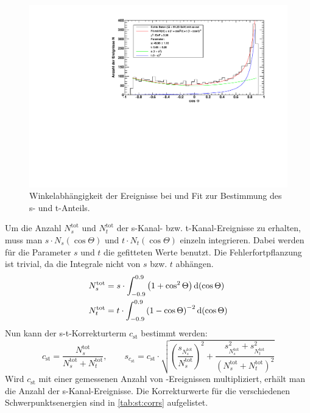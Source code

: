 \begin{figure}[H]
    \begin{center}
        \includegraphics[width=\textwidth]{../img/s_t_fit_91-23.pdf}
        \caption{Winkelabhängigkeit der Ereignisse bei  und Fit zur Bestimmung des s- und t-Anteils.}
        \label{img:st:9123}
    \end{center}
\end{figure}
Um die Anzahl $N_s^\text{tot}$ und $N_t^\text{tot}$ der s-Kanal- bzw. t-Kanal-Ereignisse zu erhalten, muss man
$s \cdot N_s(\cos \Theta)$ und $t \cdot N_t(\cos \Theta)$ einzeln integrieren. Dabei werden für die Parameter $s$ und $t$ die
gefitteten Werte benutzt. Die Fehlerfortpflanzung ist trivial, da die Integrale nicht von $s$ bzw. $t$ abhängen.
\begin{equation}
    \begin{split}
        & N_s^\text{tot} = s \cdot \int_{-0.9}^{0.9} \left( 1 + \cos^2 \Theta \right) \mathrm{d} (\cos \Theta) \\
        & N_t^\text{tot} = t \cdot \int_{-0.9}^{0.9} \left( 1 - \cos \Theta \right)^{-2} \mathrm{d} (\cos \Theta)
    \end{split}
\end{equation}
Nun kann der s-t-Korrekturterm $c_{\text{st}}$ bestimmt werden:
\begin{equation}
    c_{\text{st}} = \frac{N_s^\text{tot}}{N_s^\text{tot} + N_t^\text{tot}}, \qquad
    s_{c_{\text{st}}} = c_{\text{st}} \cdot \sqrt{ \left( \frac{s_{N_s^\text{tot}}}{N_s^\text{tot}} \right)^2 +
    \frac{s_{N_s^\text{tot}}^2 + s_{N_t^\text{tot}}^2}{ \left( N_s^\text{tot} + N_t^\text{tot} \right)^2 } }
\end{equation}
Wird $c_{\text{st}}$ mit einer gemessenen Anzahl von \ee -Ereignissen multipliziert, erhält man die Anzahl der s-Kanal-Ereignisse.
Die Korrekturwerte für die verschiedenen Schwerpunktsenergien sind in \autoref{tab:st:corrs} aufgelistet.


